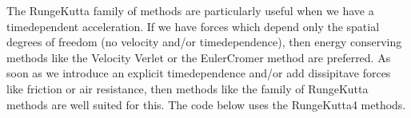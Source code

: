 \documentclass[letterpaper,10pt,english]{sphinxmanual}
\begin{document}
\begin{sphinxVerbatim}[commandchars=\\\{\}]
        \PYG{p}{[}\PYG{p}{]}  \PYG{p}{[}\PYG{p}{]}
        \PYG{p}{[}\PYG{p}{]}  \PYG{p}{[}\PYG{p}{]}  
\end{sphinxVerbatim}

The Runge\sphinxhyphen{}Kutta family of methods are particularly useful when we have a time\sphinxhyphen{}dependent acceleration.
If we have forces which depend only the spatial degrees of freedom (no velocity and/or time\sphinxhyphen{}dependence), then energy conserving methods like the Velocity Verlet or the Euler\sphinxhyphen{}Cromer method are preferred. As soon as we introduce an explicit time\sphinxhyphen{}dependence and/or add dissipitave forces like friction or air resistance, then methods like the family of Runge\sphinxhyphen{}Kutta methods are well suited for this.
The code below uses the Runge\sphinxhyphen{}Kutta4 methods.
\end{document}
